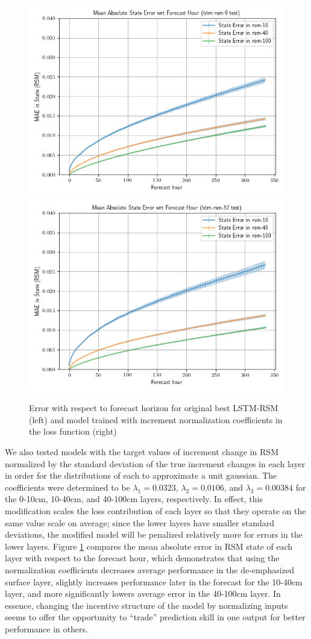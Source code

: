\begin{figure}[H]
    \centering
    \includegraphics[width=.48\linewidth,draft=false]{figures/loss-variations/eval_test_lstm-rsm-9_rsm_horizon_na_state.png}
    \includegraphics[width=.48\linewidth,draft=false]{figures/loss-variations/eval_test_lstm-rsm-57_rsm_horizon_na_state.png}

    \caption{Error with respect to forecast horizon for original best LSTM-RSM (left) and model trained with increment normalization coefficients in the loss function (right)}
    \label{loss-fn-norm-horizons}
\end{figure}

We also tested models with the target values of increment change in RSM normalized by the standard deviation of the true increment changes in each layer in order for the distributions of each to approximate a unit gaussian. The coefficients were determined to be $\lambda_1=0.0323$, $\lambda_2=0.0106$, and $\lambda_3=0.00384$ for the 0-10cm, 10-40cm, and 40-100cm layers, respectively. In effect, this modification scales the loss contribution of each layer so that they operate on the same value scale on average; since the lower layers have smaller standard deviations, the modified model will be penalized relatively more for errors in the lower layers. Figure \ref{loss-fn-norm-horizons} compares the mean absolute error in RSM state of each layer with respect to the forecast hour, which demonstrates that using the normalization coefficients decreases average performance in the de-emphasized surface layer, slightly increases performance later in the forecast for the 10-40cm layer, and more significantly lowers average error in the 40-100cm layer. In essence, changing the incentive structure of the model by normalizing inputs seems to offer the opportunity to ``trade'' prediction skill in one output for better performance in others.

